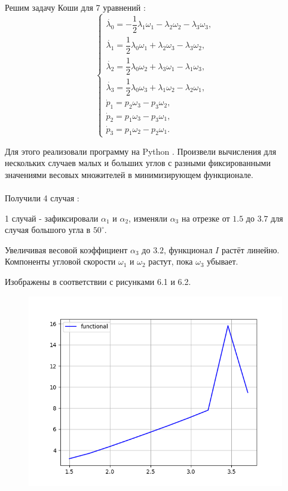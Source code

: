 \documentclass[14pt]{extreport}
\begin{document}
Решим задачу Коши для 7 уравнений \cite{moiseev}:
\begin{equation}
\begin{cases}
\dot{\lambda_{0}} = -\dfrac{1}{2} \lambda_{1}\omega_{1} - \lambda_{2}\omega_{2} - \lambda_{3}\omega_{3},\\
\dot{\lambda_{1}} = \dfrac{1}{2} \lambda_{0}\omega_{1} + \lambda_{2}\omega_{3} - \lambda_{3}\omega_{2},\\
\dot{\lambda_{2}} = \dfrac{1}{2} \lambda_{0}\omega_{2} + \lambda_{3}\omega_{1} - \lambda_{1}\omega_{3},\\
\dot{\lambda_{3}} = \dfrac{1}{2} \lambda_{0}\omega_{3} + \lambda_{1}\omega_{2} - \lambda_{2}\omega_{1},\\
\dot{p}_1 = p_2 \omega_3 - p_3 \omega_2,\\
\dot{p}_2 = p_1 \omega_3 - p_3 \omega_1,\\
\dot{p}_3 = p_1 \omega_2 - p_2 \omega_1.
\end{cases}
\end{equation}

Для этого реализовали программу на Python \cite{python}. Произвели вычисления для нескольких случаев малых и больших углов с разными фиксированными значениями весовых множителей в минимизирующем функционале.\\\\

Получили 4 случая \cite{scipy}:

1 случай - зафиксировали $\alpha_1$ и $\alpha_2$, изменяли $\alpha_3$ на отрезке от $1.5$ до $3.7$ для случая большого угла в $50^{\circ}$.

Увеличивая весовой коэффициент $\alpha_3$ до $3.2$, функционал $I$ растёт линейно. Компоненты угловой скорости $\omega_1$ и $\omega_2$ растут, пока $\omega_3$ убывает.

Изображены в соответствии с рисунками 6.1 и 6.2.

\begin{figure}[H]
\center\includegraphics[scale=0.8]{fig/functional_1_5-3_7_50.png}
\caption{}
\end{figure}
\end{document}
